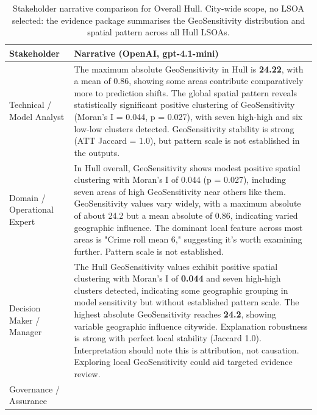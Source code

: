 
\begin{table}[H]
\centering
\caption{Stakeholder narrative comparison for Overall Hull. City-wide scope, no LSOA selected: the evidence package summarises the GeoSensitivity distribution and spatial pattern across all Hull LSOAs.}
\label{tab:stakeholder_narratives_overall}
\small
\begin{tabularx}{\textwidth}{p{} X}
\toprule
Stakeholder & Narrative (OpenAI, {\ttfamily gpt-4.1-mini}) \\
\midrule
Technical / Model Analyst &
The maximum absolute GeoSensitivity in Hull is \textbf{24.22}, with a mean of 0.86, showing some areas contribute comparatively more to prediction shifts. The global spatial pattern reveals statistically significant positive clustering of GeoSensitivity (Moran's I = 0.044, p = 0.027), with seven high-high and six low-low clusters detected. GeoSensitivity stability is strong (ATT Jaccard = 1.0), but pattern scale is not established in the outputs. \\
Domain / Operational Expert &
In Hull overall, GeoSensitivity shows modest positive spatial clustering with Moran’s I of 0.044 (p = 0.027), including seven areas of high GeoSensitivity near others like them. GeoSensitivity values vary widely, with a maximum absolute of about 24.2 but a mean absolute of 0.86, indicating varied geographic influence. The dominant local feature across most areas is "Crime roll mean 6," suggesting it’s worth examining further. Pattern scale is not established. \\
Decision Maker / Manager &
The Hull GeoSensitivity values exhibit positive spatial clustering with Moran's I of \textbf{0.044} and seven high-high clusters detected, indicating some geographic grouping in model sensitivity but without established pattern scale. The highest absolute GeoSensitivity reaches \textbf{24.2}, showing variable geographic influence citywide. Explanation robustness is strong with perfect local stability (Jaccard 1.0). Interpretation should note this is attribution, not causation. Exploring local GeoSensitivity could aid targeted evidence review. \\
Governance / Assurance &

\end{tabularx}
\end{table}
